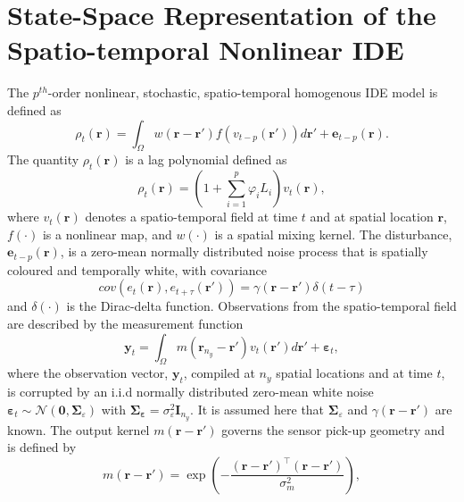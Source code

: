 \documentclass[a4paper,10pt]{article}
\begin{document}
\section{State-Space Representation of the Spatio-temporal Nonlinear IDE}
The $p^{th}$-order nonlinear, stochastic, spatio-temporal homogenous IDE model
is defined as
 \begin{equation}\label{eq:IDEModel}
  \rho_t(\mathbf r)=\int_{\Omega}w(\mathbf r-\mathbf r')f(v_{t-p}(\mathbf
r'))d\mathbf r'+\mathbf e_{t-p}(\mathbf r). 
 \end{equation}
The quantity $\rho_t(\mathbf r)$ is a lag polynomial defined as
\begin{equation}\label{eq:LagPolynomial}
 \rho_t(\mathbf r)=(1+\sum_{i=1}^{p}\varphi_i L_i)v_{t}\left(\mathbf r\right),
\end{equation}
where $v_t(\mathbf r)$ denotes a spatio-temporal field at time $t$ and at
spatial location $\mathbf r$, $f(\cdot)$ is a nonlinear map, and $w(\cdot)$ is a
spatial mixing kernel. The disturbance, $\mathbf e_{t-p}(\mathbf r)$, is a
zero-mean normally distributed noise process that is spatially
coloured and temporally white, with covariance
\begin{equation}
cov\left(e_{t}\left(\mathbf{r}\right),e_{t+\tau}\left(\mathbf{r'}\right)\right)=
\gamma\left(\mathbf{r}-\mathbf{r'}\right)\delta(t-\tau)
\label{eq:FieldCovariance}
\end{equation}
and $\delta(\cdot)$ is the Dirac-delta function.
Observations from the spatio-temporal field are described by the measurement
function
\begin{equation}
    \label{eq:ObservationEquation}
	\mathbf{y}_t =
	\int_{\Omega}{	   
m\left(\mathbf{r}_{n_y}-\mathbf{r}'\right)v_t\left(\mathbf{r}'\right)
	d\mathbf{r}'} + 
	\boldsymbol{\varepsilon}_t, 
\end{equation}
where the observation vector, $\mathbf{y}_{t}$, compiled at $n_{y}$ spatial
locations and at time $t$, is corrupted by an i.i.d normally distributed
zero-mean white noise ${\boldsymbol\varepsilon}_t\sim
\mathcal{N}\left(\mathbf{0},\boldsymbol\Sigma_{\varepsilon}\right)$ with
$\mathbf{\Sigma}_{\boldsymbol\varepsilon}=\sigma_{\varepsilon}^2\mathbf I_{n_y}
$. It is assumed here that $\boldsymbol\Sigma_{\varepsilon}$ and
$\gamma\left(\mathbf r-\mathbf r' \right)$ are known. The output kernel
$m(\mathbf{r}-\mathbf{r}')$ governs the sensor pick-up geometry and is defined
by 
\begin{equation}\label{eq:SensorKernel}
	m\left(\mathbf{r}-\mathbf{r}'\right) =
\exp{\left(-\frac{(\mathbf{r}-\mathbf{r}')^\top(\mathbf{r}-\mathbf{r}')}{
\sigma_m^2}\right)},
\end{equation}
\end{document}
